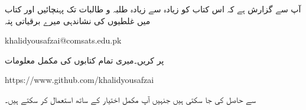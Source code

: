 آپ سے گزارش ہے کہ اس کتاب کو زیادہ سے زیادہ طلبہ و طالبات تک پہنچائیں اور کتاب میں غلطیوں کی نشاندہی میرے  برقیاتی پتہ
{
\begin{otherlanguage}{english}
khalidyousafzai@comsats.edu.pk
\end{otherlanguage}
}
 پر کریں۔میری تمام کتابوں کی مکمل  معلومات

{
\begin{otherlanguage}{english}
https:/\!\!/www.github.com/khalidyousafzai
\end{otherlanguage}
}

سے حاصل کی جا سکتی ہیں جنہیں آپ مکمل اختیار کے ساتھ استعمال کر سکتے ہیں۔

\vspace{5mm}

{}
